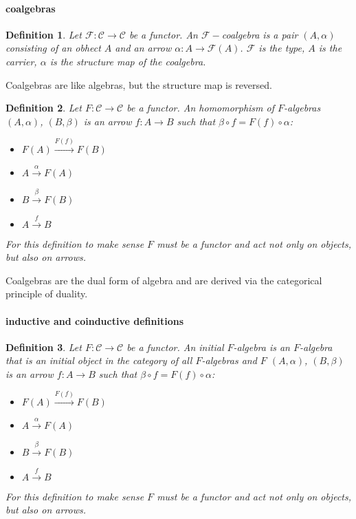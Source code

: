 \documentclass[]{article}
\newtheorem{definition}{Definition}
\begin{document}
\paragraph{coalgebras}
\begin{definition}
    Let $\mathcal{F}: \mathcal{C} \rightarrow \mathcal{C}$ be a functor. An $\mathcal{F}-$coalgebra is a pair $(A,\alpha)$ consisting of an obhect $A$ and an arrow 
    $\alpha:A\rightarrow \mathcal{F}(A)$. $\mathcal{F}$ is the type, $A$ is the carrier, $\alpha$ is the structure map of the coalgebra.
\end{definition}

Coalgebras are like algebras, but the structure map is reversed.

\begin{definition}
    Let $F: \mathcal{C} \rightarrow \mathcal{C}$ be a functor. 
    An homomorphism of $F$-algebras $(A,\alpha)$, $(B,\beta)$ is an arrow $f:A\rightarrow B$ such that $\beta\circ f = F(f)\circ \alpha$:
    \begin{itemize}
        \item $F(A)\xrightarrow{F(f)}F(B)$
        \item $A\xrightarrow{\alpha}F(A)$
        \item $B\xrightarrow{\beta}F(B)$
        \item $A\xrightarrow{f}B$
    \end{itemize}
    For this definition to make sense $F$ must be a functor and act not only on objects, but also on arrows.
\end{definition}

Coalgebras are the dual form of algebra and are derived via the categorical principle of duality.

\paragraph{inductive and coinductive definitions}

\begin{definition}
    Let $F: \mathcal{C} \rightarrow \mathcal{C}$ be a functor. 
    An initial $F$-algebra is an $F$-algebra that is an \textit{initial object} in the category of all $F$-algebras and $F$ $(A,\alpha)$, $(B,\beta)$ is an arrow $f:A\rightarrow B$ such that $\beta\circ f = F(f)\circ \alpha$:
    \begin{itemize}
        \item $F(A)\xrightarrow{F(f)}F(B)$
        \item $A\xrightarrow{\alpha}F(A)$
        \item $B\xrightarrow{\beta}F(B)$
        \item $A\xrightarrow{f}B$
    \end{itemize}
    For this definition to make sense $F$ must be a functor and act not only on objects, but also on arrows.
\end{definition}
\end{document}
